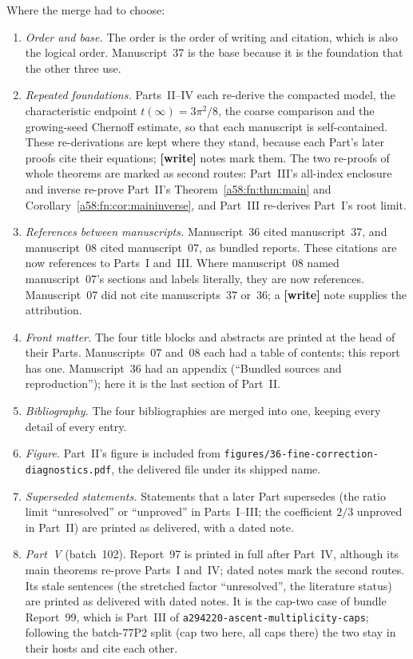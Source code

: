 \documentclass[11pt,letterpaper]{article}
\newcommand{\file}[1]{\nolinkurl{#1}}
\theoremstyle{remark}
\begin{document}
Where the merge had to choose:
\begin{enumerate}
\item \emph{Order and base.} The order is the order of writing and citation, which is also the logical order. Manuscript~37 is the base because it is the foundation that the other three use.
\item \emph{Repeated foundations.} Parts~II--IV each re-derive the compacted model, the characteristic endpoint $t(\infty)=3\pi^2/8$, the coarse comparison and the growing-seed Chernoff estimate, so that each manuscript is self-contained. These re-derivations are kept where they stand, because each Part's later proofs cite their equations; \textbf{[write]} notes mark them. The two re-proofs of whole theorems are marked as second routes: Part~III's all-index enclosure and inverse re-prove Part~II's Theorem~\ref{a58:fn:thm:main} and Corollary~\ref{a58:fn:cor:maininverse}, and Part~III re-derives Part~I's root limit.
\item \emph{References between manuscripts.} Manuscript~36 cited manuscript~37, and manuscript~08 cited manuscript~07, as bundled reports. These citations are now references to Parts~I and~III. Where manuscript~08 named manuscript~07's sections and labels literally, they are now references. Manuscript~07 did not cite manuscripts~37 or~36; a \textbf{[write]} note supplies the attribution.
\item \emph{Front matter.} The four title blocks and abstracts are printed at the head of their Parts. Manuscripts~07 and~08 each had a table of contents; this report has one. Manuscript~36 had an appendix (``Bundled sources and reproduction''); here it is the last section of Part~II.
\item \emph{Bibliography.} The four bibliographies are merged into one, keeping every detail of every entry.
\item \emph{Figure.} Part~II's figure is included from \file{figures/36-fine-correction-diagnostics.pdf}, the delivered file under its shipped name.
\item \emph{Superseded statements.} Statements that a later Part supersedes (the ratio limit ``unresolved'' or ``unproved'' in Parts~I--III; the coefficient $2/3$ unproved in Part~II) are printed as delivered, with a dated note.
\item \emph{Part~V} (batch~102). Report~97 is printed in full after Part~IV, although its main theorems re-prove Parts~I and~IV; dated notes mark the second routes. Its stale sentences (the stretched factor ``unresolved'', the literature status) are printed as delivered with dated notes. It is the cap-two case of bundle Report~99, which is Part~III of \file{a294220-ascent-multiplicity-caps}; following the batch-77P2 split (cap two here, all caps there) the two stay in their hosts and cite each other.

\end{enumerate}
\end{document}
